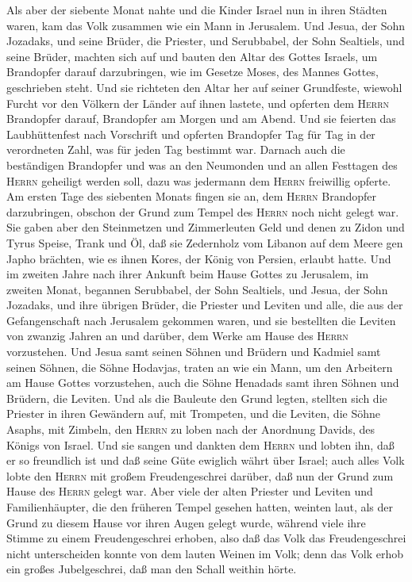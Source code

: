  Als aber der siebente Monat nahte und die Kinder Israel
nun in ihren Städten waren, kam das Volk zusammen wie ein Mann in
Jerusalem.  Und Jesua, der Sohn Jozadaks, und seine
Brüder, die Priester, und Serubbabel, der Sohn Sealtiels, und seine
Brüder, machten sich auf und bauten den Altar des Gottes Israels, um
Brandopfer darauf darzubringen, wie im Gesetze Moses, des Mannes Gottes,
geschrieben steht.  Und sie richteten den Altar her auf
seiner Grundfeste, wiewohl Furcht vor den Völkern der Länder auf ihnen
lastete, und opferten dem \textsc{Herrn} Brandopfer darauf, Brandopfer
am Morgen und am Abend.  Und sie feierten das
Laubhüttenfest nach Vorschrift und opferten Brandopfer Tag für Tag in
der verordneten Zahl, was für jeden Tag bestimmt war. 
Darnach auch die beständigen Brandopfer und was an den Neumonden und an
allen Festtagen des \textsc{Herrn} geheiligt werden soll, dazu was
jedermann dem \textsc{Herrn} freiwillig opferte.  Am
ersten Tage des siebenten Monats fingen sie an, dem \textsc{Herrn}
Brandopfer darzubringen, obschon der Grund zum Tempel des \textsc{Herrn}
noch nicht gelegt war.  Sie gaben aber den Steinmetzen und
Zimmerleuten Geld und denen zu Zidon und Tyrus Speise, Trank und Öl, daß
sie Zedernholz vom Libanon auf dem Meere gen Japho brächten, wie es
ihnen Kores, der König von Persien, erlaubt hatte.  Und im
zweiten Jahre nach ihrer Ankunft beim Hause Gottes zu Jerusalem, im
zweiten Monat, begannen Serubbabel, der Sohn Sealtiels, und Jesua, der
Sohn Jozadaks, und ihre übrigen Brüder, die Priester und Leviten und
alle, die aus der Gefangenschaft nach Jerusalem gekommen waren, und sie
bestellten die Leviten von zwanzig Jahren an und darüber, dem Werke am
Hause des \textsc{Herrn} vorzustehen.  Und Jesua samt
seinen Söhnen und Brüdern und Kadmiel samt seinen Söhnen, die Söhne
Hodavjas, traten an wie ein Mann, um den Arbeitern am Hause Gottes
vorzustehen, auch die Söhne Henadads samt ihren Söhnen und Brüdern, die
Leviten.  Und als die Bauleute den Grund legten, stellten
sich die Priester in ihren Gewändern auf, mit Trompeten, und die
Leviten, die Söhne Asaphs, mit Zimbeln, den \textsc{Herrn} zu loben nach
der Anordnung Davids, des Königs von Israel.  Und sie
sangen und dankten dem \textsc{Herrn} und lobten ihn, daß er so
freundlich ist und daß seine Güte ewiglich währt über Israel; auch alles
Volk lobte den \textsc{Herrn} mit großem Freudengeschrei darüber, daß
nun der Grund zum Hause des \textsc{Herrn} gelegt war. 
Aber viele der alten Priester und Leviten und Familienhäupter, die den
früheren Tempel gesehen hatten, weinten laut, als der Grund zu diesem
Hause vor ihren Augen gelegt wurde, während viele ihre Stimme zu einem
Freudengeschrei erhoben,  also daß das Volk das
Freudengeschrei nicht unterscheiden konnte von dem lauten Weinen im
Volk; denn das Volk erhob ein großes Jubelgeschrei, daß man den Schall
weithin hörte.

